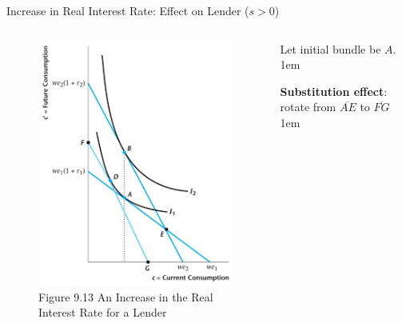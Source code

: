 \documentclass[11pt,aspectratio=43,usenames,dvipsnames]{beamer}
\let\olditemize=\itemize
\let\endolditemize=\enditemize
\renewenvironment{itemize}{\olditemize \itemsep1em}{\endolditemize}
\theoremstyle{definition}
\begin{document}
\begin{frame}{Increase in Real Interest Rate: Effect on Lender ($s > 0$)}
\label{slide:Increase_in_Real_Interest_Rate__Effect_on_Lender}
    \begin{columns}
        \begin{column}{0.5\textwidth}
            \begin{figure}
                \caption{\scriptsize Figure 9.13  An Increase in the Real Interest Rate for a Lender}
                \includegraphics[width=\textwidth]{./figures/Figure9_13.jpg}
            \end{figure}
        \end{column}
        \begin{column}{0.5\textwidth}
            Let initial bundle be $ A $.
            \begin{itemize}
                \item \textbf{Substitution effect}: rotate from $ \overline{AE} $ to $ \overline{FG} $
                \begin{itemize}

\end{itemize}
\end{itemize}
\end{column}
\end{columns}
\end{frame}
\end{document}
